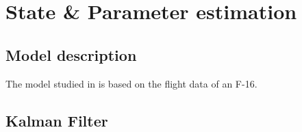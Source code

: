 \chapter{State \& Parameter estimation}
\label{chapter:state-parameter-estimation}

\section{Model description}
The model studied in is based on the flight data of an F-16.

\section{Kalman Filter}
